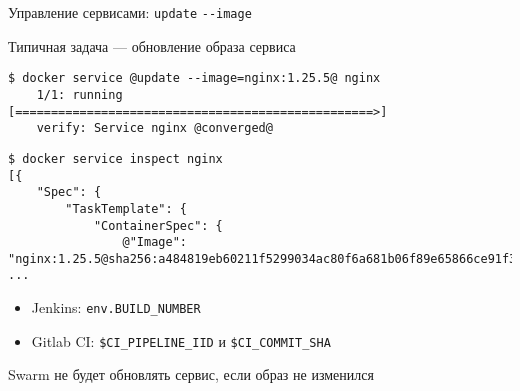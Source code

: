 \begin{frame}[fragile]{Управление сервисами: \texttt{update} \texttt{-{}-image} }

Типичная задача --- обновление образа сервиса

\begin{tcolorbox-code}
\begin{lstlisting}[style=base]
    $ docker service @update --image=nginx:1.25.5@ nginx
    1/1: running   [==================================================>] 
    verify: Service nginx @converged@
    \end{lstlisting}
\end{tcolorbox-code}

\begin{tcolorbox-code}
\begin{lstlisting}[style=base]
$ docker service inspect nginx
[{      
    "Spec": {
        "TaskTemplate": {
            "ContainerSpec": {
                @"Image": "nginx:1.25.5@sha256:a484819eb60211f5299034ac80f6a681b06f89e65866ce91f356ed7c72af059c"@,
...
    \end{lstlisting}
\end{tcolorbox-code}

\begin{itemize}
    \item Jenkins: \texttt{env.BUILD\_NUMBER}
    \item Gitlab CI: \texttt{\$CI\_PIPELINE\_IID} и \texttt{\$CI\_COMMIT\_SHA}
\end{itemize}

Swarm {\color{bad} не будет обновлять сервис}, если образ не изменился

\end{frame}
